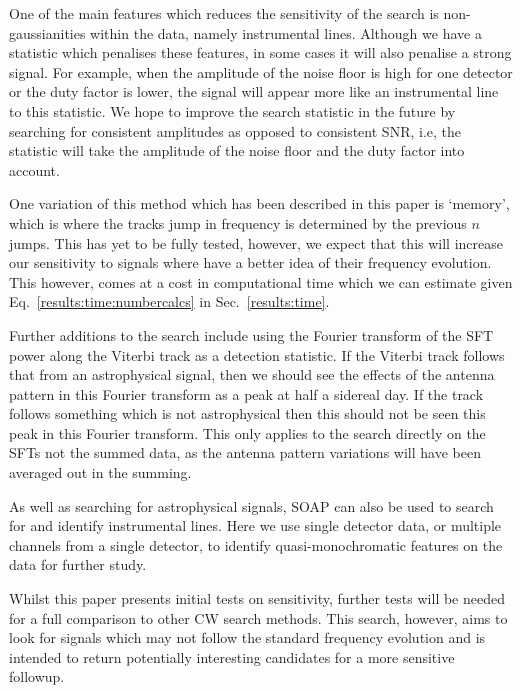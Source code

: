 One of the main features which reduces the sensitivity of the search is non-gaussianities within the data, namely instrumental lines. Although we have a statistic which penalises these features, in some cases it will also penalise a strong signal. For example, when the amplitude of the noise floor is high for one detector or the duty factor is lower, the signal will appear more like an instrumental line to this statistic. We hope to improve the search statistic in the future by searching for consistent amplitudes as opposed to consistent \ac{SNR}, i.e, the statistic will take the amplitude of the noise floor and the duty factor into account.

One variation of this method which has been described in this paper is `memory', which is where the tracks jump in frequency is determined by the previous $n$ jumps. This has yet to be fully tested, however, we expect that this will increase our sensitivity to signals where have a better idea of their frequency evolution. This however, comes at a cost in computational time which we can estimate given Eq.~\ref{results:time:numbercalcs} in Sec.~\ref{results:time}.

Further additions to the search include using the Fourier transform of the \ac{SFT} power along the Viterbi track as a detection statistic.
If the Viterbi track follows that from an astrophysical signal, then we should see the effects of the antenna pattern in this Fourier transform as a peak at half a sidereal day.
If the track follows something which is not astrophysical then this should not be seen this peak in this Fourier transform.
This only applies to the search directly on the \acp{SFT} not the summed data, as the antenna pattern variations will have been averaged out in the summing.

As well as searching for astrophysical signals, SOAP can also be used to search for and identify instrumental lines. Here we use single detector data, or multiple channels from a single detector, to identify quasi-monochromatic features on the data for further study.

Whilst this paper presents initial tests on sensitivity, further tests will be needed for a full comparison to other \ac{CW} search methods.  
This search, however, aims to look for signals which may not follow the standard
frequency evolution and is intended to return potentially interesting
candidates for a more sensitive followup.

